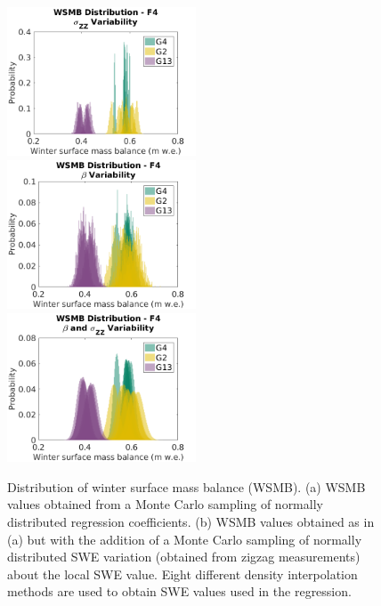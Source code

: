 \documentclass[12pt]{article}
\begin{document}
\begin{figure}[H]
	\centering
	\includegraphics[width =0.5\textwidth]{WSMB_zz.png}\\
	\includegraphics[width =0.5\textwidth]{WSMB_beta.png}\\
	\includegraphics[width =0.5\textwidth]{WSMB_betaNzz.png}\\
	\caption{Distribution of winter surface mass balance (WSMB). (a)  WSMB values obtained from a Monte Carlo sampling of normally distributed regression coefficients. (b) WSMB values obtained as in (a) but with the addition of a Monte Carlo sampling of normally distributed SWE variation (obtained from zigzag measurements) about the local SWE value. Eight different density interpolation methods are used to obtain SWE values used in the regression.}
	\label{fig:WSMB_oneDensity}
\end{figure}
\end{document}
